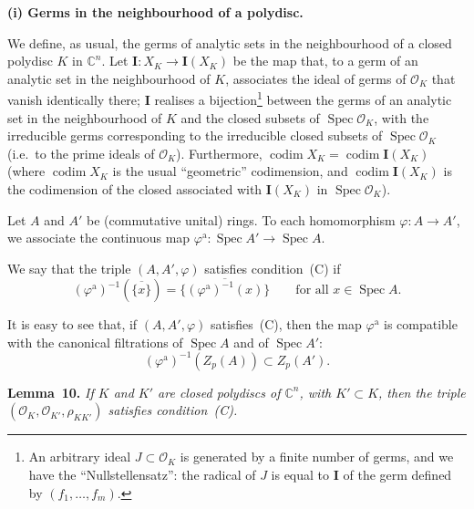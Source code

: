 \documentclass[british]{article}
\newenvironment{itenv}[1]
  {\phantomsection\par\smallskip\noindent\textbf{#1.}\itshape}
  {\par\smallskip}
\newenvironment{rmenv}[1]
  {\phantomsection\par\smallskip\noindent\textbf{#1.}\rmfamily}
  {\par\smallskip}
\begin{document}
\protect{}\label{section-5.b.i}
\begin{rmenv}{(i) Germs in the neighbourhood of a polydisc}

We define, as usual, the germs of analytic sets in the neighbourhood of
a closed polydisc \(K\) in \(\mathbb{C}^n\). Let
\(\mathbf{I}\colon X_K\to\mathbf{I}(X_K)\) be the map that, to a germ of
an analytic set in the neighbourhood of \(K\), associates the ideal of
germs of \({\mathscr{O}}_K\) that vanish identically there;
\(\mathbf{I}\) realises a bijection\footnote{An arbitrary ideal
  \(J\subset{\mathscr{O}}_K\) is generated by a finite number of germs,
  and we have the ``Nullstellensatz'': the radical of \(J\) is equal to
  \(\mathbf{I}\) of the germ defined by \((f_1,\ldots,f_m)\).} between
the germs of an analytic set in the neighbourhood of \(K\) and the
closed subsets of \(\operatorname{Spec}{{\mathscr{O}}_K}\), with the
irreducible germs corresponding to the irreducible closed subsets of
\(\operatorname{Spec}{{\mathscr{O}}_K}\) (i.e.~to the prime ideals of
\({\mathscr{O}}_K\)). Furthermore,
\(\operatorname{codim}X_K=\operatorname{codim}\mathbf{I}(X_K)\) (where
\(\operatorname{codim}X_K\) is the usual ``geometric'' codimension, and
\(\operatorname{codim}\mathbf{I}(X_K)\) is the codimension of the closed
associated with \(\mathbf{I}(X_K)\) in
\(\operatorname{Spec}{{\mathscr{O}}_K}\)).

Let \(A\) and \(A'\) be (commutative unital) rings. To each homomorphism
\(\varphi\colon A\to A'\), we associate the continuous map
\(\varphi^\mathrm{a}\colon\operatorname{Spec}{A'}\to\operatorname{Spec}{A}\).

We say that the triple \((A,A',\varphi)\) satisfies condition~(C) if \[
  (\varphi^\mathrm{a})^{-1}(\overline{\{x\}})
  = \overline{\{(\varphi^\mathrm{a})^{-1}(x)\}}
  \qquad\text{for all }x\in\operatorname{Spec}{A}.
\]

It is easy to see that, if \((A,A',\varphi)\) satisfies~(C), then the
map \(\varphi^\mathrm{a}\) is compatible with the canonical filtrations
of \(\operatorname{Spec}{A}\) and of \(\operatorname{Spec}{A'}\): \[
  (\varphi^\mathrm{a})^{-1}(Z_p(A)) \subset Z_p(A').
\]

\protect{}\label{lemma-10}
\begin{itenv}{Lemma 10}
If \(K\) and \(K'\) are closed polydiscs of \(\mathbb{C}^n\), with
\(K'\subset K\), then the triple
\(({\mathscr{O}}_K,{\mathscr{O}}_{K'},\rho_{KK'})\) satisfies
condition~(C).

\end{itenv}


\end{rmenv}
\end{document}
